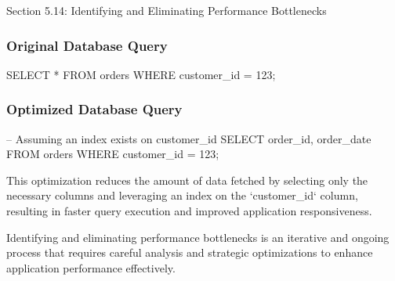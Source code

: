 \begin{notes}{Section 5.14: Identifying and Eliminating Performance Bottlenecks}
\begin{highlight}
        \subsubsection*{Original Database Query}
    
    \begin{code}[SQL]
    SELECT * FROM orders WHERE customer_id = 123;
    \end{code}
    
        \subsubsection*{Optimized Database Query}
    
    \begin{code}[SQL]
    -- Assuming an index exists on customer_id
    SELECT order_id, order_date FROM orders WHERE customer_id = 123;
    \end{code}
    
        This optimization reduces the amount of data fetched by selecting only the necessary columns and leveraging an index on the `customer\_id` column, resulting in faster query execution and improved 
        application responsiveness.
    \end{highlight}
    
    Identifying and eliminating performance bottlenecks is an iterative and ongoing process that requires careful analysis and strategic optimizations to enhance application performance effectively.
\end{notes}